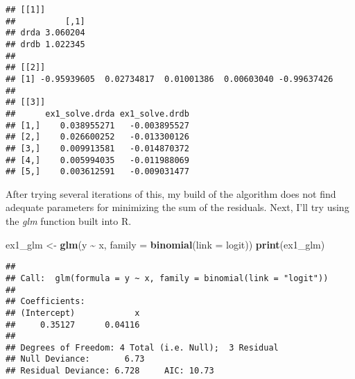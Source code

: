 \documentclass[
]{article}
\newenvironment{Shaded}{\begin{snugshade}}{\end{snugshade}}
\newcommand{\ControlFlowTok}[1]{\textcolor[rgb]{0.13,0.29,0.53}{\textbf{#1}}}
\newcommand{\DataTypeTok}[1]{\textcolor[rgb]{0.13,0.29,0.53}{#1}}
\newcommand{\DecValTok}[1]{\textcolor[rgb]{0.00,0.00,0.81}{#1}}
\newcommand{\KeywordTok}[1]{\textcolor[rgb]{0.13,0.29,0.53}{\textbf{#1}}}
\newcommand{\NormalTok}[1]{#1}
\newcommand{\OperatorTok}[1]{\textcolor[rgb]{0.81,0.36,0.00}{\textbf{#1}}}
\newcommand{\StringTok}[1]{\textcolor[rgb]{0.31,0.60,0.02}{#1}}
\begin{document}
\begin{verbatim}
## [[1]]
##          [,1]
## drda 3.060204
## drdb 1.022345
## 
## [[2]]
## [1] -0.95939605  0.02734817  0.01001386  0.00603040 -0.99637426
## 
## [[3]]
##      ex1_solve.drda ex1_solve.drdb
## [1,]    0.038955271   -0.003895527
## [2,]    0.026600252   -0.013300126
## [3,]    0.009913581   -0.014870372
## [4,]    0.005994035   -0.011988069
## [5,]    0.003612591   -0.009031477
\end{verbatim}

After trying several iterations of this, my build of the algorithm does
not find adequate parameters for minimizing the sum of the residuals.
Next, I'll try using the \emph{glm} function built into R.

\begin{Shaded}
\begin{Highlighting}[]
\NormalTok{ex1\_glm \textless{}{-}}\StringTok{ }\KeywordTok{glm}\NormalTok{(y }\OperatorTok{\textasciitilde{}}\StringTok{ }\NormalTok{x, }\DataTypeTok{family =} \KeywordTok{binomial}\NormalTok{(}\DataTypeTok{link =} \StringTok{\textquotesingle{}logit\textquotesingle{}}\NormalTok{))}
\KeywordTok{print}\NormalTok{(ex1\_glm)}
\end{Highlighting}
\end{Shaded}

\begin{verbatim}
## 
## Call:  glm(formula = y ~ x, family = binomial(link = "logit"))
## 
## Coefficients:
## (Intercept)            x  
##     0.35127      0.04116  
## 
## Degrees of Freedom: 4 Total (i.e. Null);  3 Residual
## Null Deviance:       6.73 
## Residual Deviance: 6.728     AIC: 10.73
\end{verbatim}

\begin{Shaded}
\end{Shaded}
\end{document}
